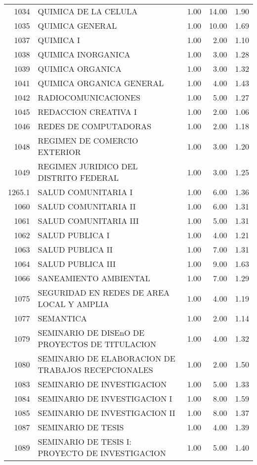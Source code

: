 \begin{table}[ht]
\begin{tabular}{rlrrr}
  1034 & QUIMICA DE LA CELULA & 1.00 & 14.00 & 1.90 \\ 
  1035 & QUIMICA GENERAL & 1.00 & 10.00 & 1.69 \\ 
  1037 & QUIMICA I & 1.00 & 2.00 & 1.10 \\ 
  1038 & QUIMICA INORGANICA & 1.00 & 3.00 & 1.28 \\ 
  1039 & QUIMICA ORGANICA & 1.00 & 3.00 & 1.32 \\ 
  1041 & QUIMICA ORGANICA GENERAL & 1.00 & 4.00 & 1.43 \\ 
  1042 & RADIOCOMUNICACIONES & 1.00 & 5.00 & 1.27 \\ 
  1045 & REDACCION CREATIVA I & 1.00 & 2.00 & 1.06 \\ 
  1046 & REDES DE COMPUTADORAS & 1.00 & 2.00 & 1.18 \\ 
  1048 & REGIMEN DE COMERCIO EXTERIOR & 1.00 & 3.00 & 1.20 \\ 
  1049 & REGIMEN JURIDICO DEL DISTRITO FEDERAL & 1.00 & 3.00 & 1.25 \\ 
  1265.1 & SALUD COMUNITARIA I & 1.00 & 6.00 & 1.36 \\ 
  1060 & SALUD COMUNITARIA II & 1.00 & 6.00 & 1.31 \\ 
  1061 & SALUD COMUNITARIA III & 1.00 & 5.00 & 1.31 \\ 
  1062 & SALUD PUBLICA I & 1.00 & 4.00 & 1.21 \\ 
  1063 & SALUD PUBLICA II & 1.00 & 7.00 & 1.31 \\ 
  1064 & SALUD PUBLICA III & 1.00 & 9.00 & 1.63 \\ 
  1066 & SANEAMIENTO AMBIENTAL & 1.00 & 7.00 & 1.29 \\ 
  1075 & SEGURIDAD EN REDES DE AREA LOCAL Y AMPLIA & 1.00 & 4.00 & 1.19 \\ 
  1077 & SEMANTICA & 1.00 & 2.00 & 1.14 \\ 
  1079 & SEMINARIO DE DISEnO DE PROYECTOS DE TITULACION & 1.00 & 4.00 & 1.32 \\ 
  1080 & SEMINARIO DE ELABORACION DE TRABAJOS RECEPCIONALES & 1.00 & 2.00 & 1.50 \\ 
  1083 & SEMINARIO DE INVESTIGACION & 1.00 & 5.00 & 1.33 \\ 
  1084 & SEMINARIO DE INVESTIGACION I & 1.00 & 8.00 & 1.59 \\ 
  1085 & SEMINARIO DE INVESTIGACION II & 1.00 & 8.00 & 1.37 \\ 
  1087 & SEMINARIO DE TESIS & 1.00 & 4.00 & 1.39 \\ 
  1089 & SEMINARIO DE TESIS I: PROYECTO DE INVESTIGACION & 1.00 & 5.00 & 1.40 \\ 

\end{tabular}
\end{table}
